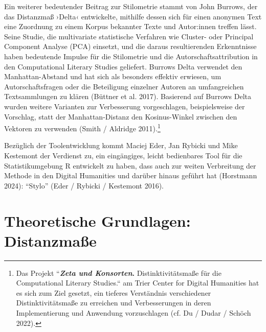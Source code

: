 \documentclass[
  12pt,
  letterpaper,
  DIV=11,
  numbers=noendperiod]{scrreprt}
\begin{document}
Ein weiterer bedeutender Beitrag zur Stilometrie stammt von John
Burrows, der das Distanzmaß ›Delta‹ entwickelte, mithilfe dessen sich
für einen anonymen Text eine Zuordnung zu einem Korpus bekannter Texte
und Autor:innen treffen lässt. Seine Studie, die multivariate
statistische Verfahren wie Cluster- oder Principal Component Analyse
(PCA) einsetzt, und die daraus resultierenden Erkenntnisse haben
bedeutende Impulse für die Stilometrie und die Autorschaftsattribution
in den Computational Literary Studies geliefert. Burrows Delta verwendet
den Manhattan-Abstand und hat sich als besonders effektiv erwiesen, um
Autorschaftsfragen oder die Beteiligung einzelner Autoren an
umfangreichen Textsammlungen zu klären (Büttner et al. 2017). Basierend
auf Burrows Delta wurden weitere Varianten zur Verbesserung
vorgeschlagen, beispielsweise der Vorschlag, statt der Manhattan-Distanz
den Kosinus-Winkel zwischen den Vektoren zu verwenden (Smith / Aldridge
2011).\footnote{Das Projekt ``\textbf{\emph{Zeta und Konsorten}.}
  Distinktivitätsmaße für die Computational Literary Studies.`` am Trier
  Center for Digital Humanities hat es sich zum Ziel gesetzt, ein
  tieferes Verständnis verschiedener Distinktivitätsmaße zu erreichen
  und Verbesserungen in deren Implementierung und Anwendung
  vorzuschlagen (cf. Du / Dudar / Schöch 2022).}

Bezüglich der Toolentwicklung kommt Maciej Eder, Jan Rybicki und Mike
Kestemont der Verdienst zu, ein eingängiges, leicht bedienbares Tool für
die Statistikumgebung R entwickelt zu haben, dass auch zur weiten
Verbreitung der Methode in den Digital Humanities und darüber hinaus
geführt hat (Horstmann 2024): ``Stylo'' (Eder / Rybicki / Kestemont
2016).

\section{Theoretische Grundlagen:
Distanzmaße}\label{theoretische-grundlagen-distanzmauxdfe}
\end{document}
